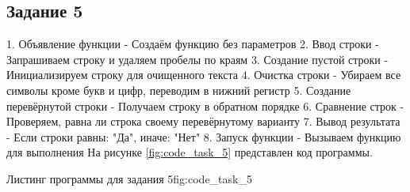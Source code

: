 \documentclass[]{vvsu}
\begin{document}
\subsection{Задание 5}

1. Объявление функции - Создаём функцию  без параметров  
2. Ввод строки - Запрашиваем строку и удаляем пробелы по краям  
3. Создание пустой строки - Инициализируем строку для очищенного текста  
4. Очистка строки - Убираем все символы кроме букв и цифр, переводим в нижний регистр  
5. Создание перевёрнутой строки - Получаем строку в обратном порядке  
6. Сравнение строк - Проверяем, равна ли строка своему перевёрнутому варианту  
7. Вывод результата - Если строки равны: "Да", иначе: "Нет"  
8. Запуск функции - Вызываем функцию для выполнения На рисунке \ref{fig:code_task_5} представлен код программы.

\begin{vvsu_figure}{Листинг программы для задания 5}{fig:code_task_5}
  \begin{minipage}{.75\textwidth}
    
  \end{minipage}
\end{vvsu_figure}
\end{document}
